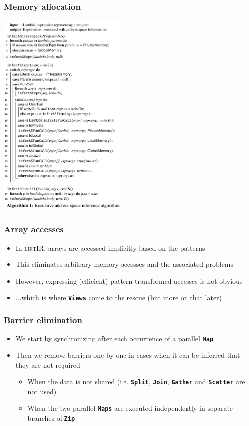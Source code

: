 \documentclass[10pt]{beamer}
\newcommand{\lift}{\textsc{lift}\space}
\newcommand{\code}[1]{\textbf{\texttt{#1}}}
\begin{document}
\begin{frame}
\frametitle{Memory allocation}
    \vspace{-1cm}
    \begin{block}{}
        \begin{center}
            \includegraphics[width=0.47\textwidth]{../images/address_space.pdf}
        \end{center}
    \end{block}
\end{frame}

\begin{frame}
\frametitle{Array accesses}
\begin{itemize}
	\item In \lift IR, arrays are accessed implicitly based on the patterns
	\item This eliminates arbitrary memory accesses and the associated problems
	\item However, expressing (efficient) pattern-transformed accesses is not obvious
	\item ...which is where \code{Views} come to the rescue (but more on that later)
\end{itemize}
\end{frame}

\begin{frame}
\frametitle{Barrier elimination}
\begin{itemize}
	\item We start by synchronizing after each occurrence of a parallel \code{Map}
	\item Then we remove barriers one by one in cases when it can be inferred that they are not required
	\begin{itemize}
		\item When the data is not shared (i.e. \code{Split}, \code{Join}, \code{Gather} and \code{Scatter} are not used)
		\item When the two parallel \code{Maps} are executed independently in separate branches of \code{Zip}
	\end{itemize}
\end{itemize}
\end{frame}
\end{document}

